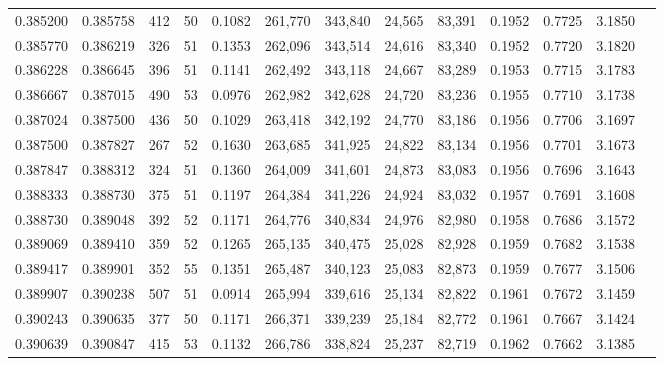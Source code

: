 \begin{tabular}{rrrrrrrrrrrrr}
0.385200 & 0.385758 &    412 &    50 &                                     0.1082 & 261,770 & 343,840 &  24,565 &  83,391 & 0.1952 & 0.7725 & 3.1850 \\
0.385770 & 0.386219 &    326 &    51 &                                     0.1353 & 262,096 & 343,514 &  24,616 &  83,340 & 0.1952 & 0.7720 & 3.1820 \\
0.386228 & 0.386645 &    396 &    51 &                                     0.1141 & 262,492 & 343,118 &  24,667 &  83,289 & 0.1953 & 0.7715 & 3.1783 \\
0.386667 & 0.387015 &    490 &    53 &                                     0.0976 & 262,982 & 342,628 &  24,720 &  83,236 & 0.1955 & 0.7710 & 3.1738 \\
0.387024 & 0.387500 &    436 &    50 &                                     0.1029 & 263,418 & 342,192 &  24,770 &  83,186 & 0.1956 & 0.7706 & 3.1697 \\
0.387500 & 0.387827 &    267 &    52 &                                     0.1630 & 263,685 & 341,925 &  24,822 &  83,134 & 0.1956 & 0.7701 & 3.1673 \\
0.387847 & 0.388312 &    324 &    51 &                                     0.1360 & 264,009 & 341,601 &  24,873 &  83,083 & 0.1956 & 0.7696 & 3.1643 \\
0.388333 & 0.388730 &    375 &    51 &                                     0.1197 & 264,384 & 341,226 &  24,924 &  83,032 & 0.1957 & 0.7691 & 3.1608 \\
0.388730 & 0.389048 &    392 &    52 &                                     0.1171 & 264,776 & 340,834 &  24,976 &  82,980 & 0.1958 & 0.7686 & 3.1572 \\
0.389069 & 0.389410 &    359 &    52 &                                     0.1265 & 265,135 & 340,475 &  25,028 &  82,928 & 0.1959 & 0.7682 & 3.1538 \\
0.389417 & 0.389901 &    352 &    55 &                                     0.1351 & 265,487 & 340,123 &  25,083 &  82,873 & 0.1959 & 0.7677 & 3.1506 \\
0.389907 & 0.390238 &    507 &    51 &                                     0.0914 & 265,994 & 339,616 &  25,134 &  82,822 & 0.1961 & 0.7672 & 3.1459 \\
0.390243 & 0.390635 &    377 &    50 &                                     0.1171 & 266,371 & 339,239 &  25,184 &  82,772 & 0.1961 & 0.7667 & 3.1424 \\
0.390639 & 0.390847 &    415 &    53 &                                     0.1132 & 266,786 & 338,824 &  25,237 &  82,719 & 0.1962 & 0.7662 & 3.1385 \\

\end{tabular}
